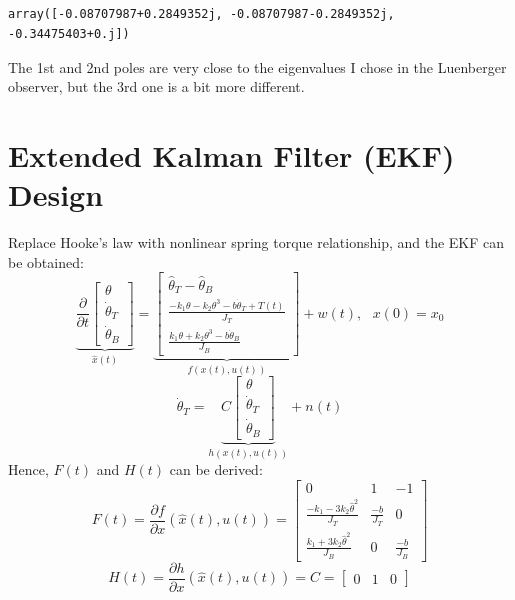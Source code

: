 \documentclass[12pt]{article}
\begin{document}
\subsection{}

\begin{Verbatim}
array([-0.08707987+0.2849352j, -0.08707987-0.2849352j, -0.34475403+0.j])
\end{Verbatim}
The 1st and 2nd poles are very close to the eigenvalues I chose in the Luenberger observer, but the 3rd one is a bit more different.
\section{Extended Kalman Filter (EKF) Design}
Replace Hooke's law with nonlinear spring torque relationship, and the EKF can be obtained:
\begin{equation}
\underbrace{\frac{\partial}{\partial t}\left[
\begin{array}{c}
\theta\\
\dot\theta_T\\
\dot\theta_B
\end{array}
\right]}_{\hat x(t)}=\underbrace{\left[
\begin{array}{c}
\hat\theta_T - \hat\theta_B\\
\frac{-k_1\theta-k_2\theta^3-b\dot\theta_T+T(t)}{J_T}\\
\frac{k_1\theta+k_2\theta^3-b\dot\theta_B}{J_B}
\end{array}	
\right]}_{f(x(t),u(t))}+w(t),\ \ \ x(0)=x_0
\end{equation} 
\begin{equation}
\dot\theta_T=\underbrace{C\left[
\begin{array}{c}
\theta\\
\dot\theta_T\\
\dot\theta_B
\end{array}
\right]}_{h(x(t),u(t))}+n(t)
\end{equation}
Hence, $F(t)$ and $H(t)$ can be derived:
\begin{equation}
F(t)=\frac{\partial f}{\partial x}(\hat x(t),u(t))=\left[
\begin{array}{ccc}
0&1&-1\\
\frac{-k_1-3k_2\hat\theta^2}{J_T}&\frac{-b}{J_T}&0\\
\frac{k_1+3k_2\hat\theta^2}{J_B}&0&\frac{-b}{J_B}
\end{array}
\right]
\end{equation}
\begin{equation}
H(t)=\frac{\partial h}{\partial x}(\hat x(t),u(t))=C=\left[
\begin{array}{ccc}
0&1&0
\end{array}\right]
\end{equation}
\end{document}
